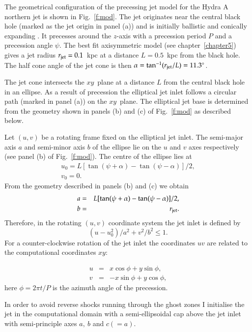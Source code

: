  The geometrical configuration of the precessing jet model for the Hydra A northern jet is shown in Fig.~\ref{f:mod}.  The jet originates near the central black hole (marked as the jet origin in panel (a)) and is initially ballistic and conically expanding \citep{komissarov98, krause12, nawaz14a}. It precesses around the $z$-axis with a precession period $P$ and a precession angle $\psi$. The best fit axisymmetric model (see chapter~\ref{chapter5}) gives a jet radius $r_{\rm jet} = 0.1$~kpc at a distance $L=0.5$~kpc from the black hole. The half cone angle of the jet cone is then $\alpha = \tan^{-1}(r_{\rm jet}/L) = 11.3^{\circ}$.

The jet cone intersects the $xy$~plane at a distance $L$ from the central black hole in an ellipse. As a result of precession the elliptical jet inlet follows a circular path (marked in panel (a)) on the $xy$~plane. The elliptical jet base is determined from the geometry shown in panels (b) and (c) of Fig.~\ref{f:mod} as described below.  

Let $(u,v)$ be a rotating frame fixed on the elliptical jet inlet. The semi-major axis $a$ and semi-minor axis $b$ of the ellipse lie on the $u$ and $v$ axes respectively (see panel (b) of Fig.~\ref{f:mod}). The centre of the ellipse lies at 
\begin{eqnarray}
u_0 = L[\tan(\psi+\alpha) - \tan(\psi - \alpha)]/2, \\
v_0 = 0.
\end{eqnarray}
From the geometry described in panels (b) and (c) we obtain 
\begin{eqnarray}
a &=& L[\tan(\psi + \alpha) - \tan(\psi -\alpha)]/2, \\
b &=& r_{\rm jet}.
\end{eqnarray}
Therefore, in the rotating $(u,v)$ coordinate system the jet inlet is defined by 
\begin{equation}
(u - u_0^2)/a^2 + v^2/ b^2 \leq 1.
\end{equation}
For a counter-clockwise rotation of the jet inlet the coordinates $uv$ are related to the computational coordinates $xy$: 

\begin{eqnarray}
u &=& x\cos \phi + y \sin \phi, \\
v &= &- x \sin \phi + y \cos \phi,
\end{eqnarray} 
here $\phi = 2\pi t/P$ is the azimuth angle of the precession. 

In order to avoid reverse shocks running through the ghost zones I initialise the jet in the computational domain with a semi-ellipsoidal cap above the jet inlet with semi-principle axes $a, \ b$ and $c (= a)$. 


